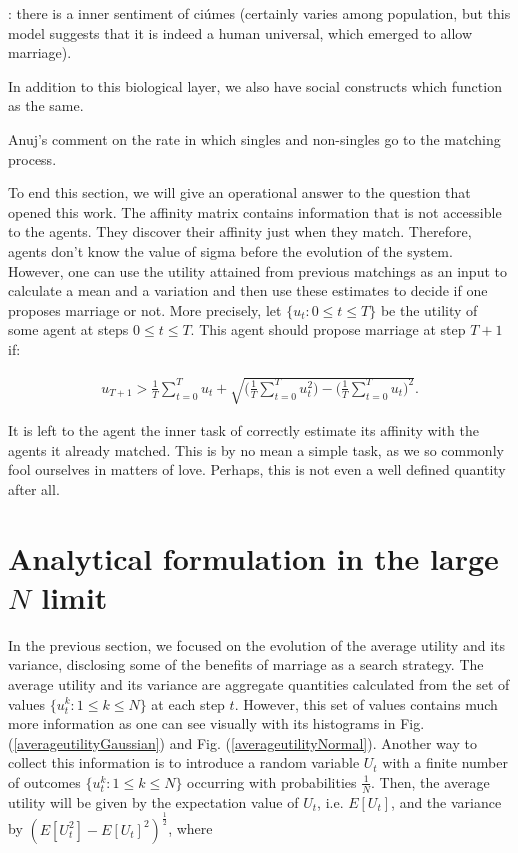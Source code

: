 \documentclass[12pt]{article}
\begin{document}
: there is a inner sentiment of ciúmes (certainly varies among population, but this model suggests that it is indeed a human universal, which emerged to allow marriage).

In addition to this biological layer, we also have social constructs which function as the same.


Anuj's comment on the rate in which singles and non-singles go to the matching process.   










\newpage

To end this section, we will give an operational answer to the question that opened this work. The affinity matrix contains information that is not accessible to the agents. They discover their affinity just when they match. Therefore, agents don't know the value of sigma before the evolution of the system. However, one can use the utility attained from previous matchings as an input to calculate a mean and a variation and then use these estimates to decide if one proposes marriage or not. More precisely, let $\{u_t:0\leq t\leq T\}$ be the utility of some agent at steps $0\leq t\leq T$. This agent should propose marriage at step $T+1$ if:

\begin{align}
    u_{T+1}>\frac{1}{T}\sum_{t=0}^Tu_t+\sqrt{\Big(\frac{1}{T}\sum_{t=0}^Tu_t^2\Big)-\Big(\frac{1}{T}\sum_{t=0}^Tu_t\Big)^2}.
\end{align}

\noindent It is left to the agent the inner task of correctly estimate its affinity with the agents it already matched. This is by no mean a simple task, as we so commonly fool ourselves in matters of love. Perhaps, this is not even a well defined quantity after all.


\section{Analytical formulation in the large \texorpdfstring{$N$}{N} limit}
\label{analytical} 

In the previous section, we focused on the evolution of the average utility and its variance, disclosing some of the benefits of marriage as a search strategy. The average utility and its variance are aggregate quantities calculated from the set of values $\{u_t^k:1\leq k\leq N\}$ at each step $t$. However, this set of values contains much more information as one can see visually with its histograms in Fig. (\ref{averageutilityGaussian}) and Fig. (\ref{averageutilityNormal}). Another way to collect this information is to introduce a random variable $U_t$ with a finite number of outcomes $\{u_t^k:1\leq k\leq N\}$ occurring with probabilities $\frac{1}{N}$. Then, the average utility will be given by the expectation value of $U_t$, i.e. $E[U_t]$, and the variance by $(E[U_t^2]-E[U_t]^2)^{\frac{1}{2}}$, where
\end{document}
